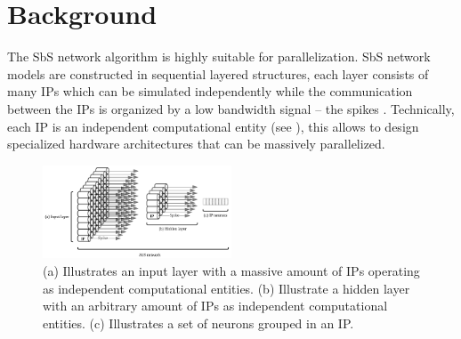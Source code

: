 \section{Background}
\label{sec:background}


The SbS network algorithm is highly suitable for parallelization. SbS network models are constructed in sequential layered structures, each layer consists of many IPs which can be simulated independently while the communication between the IPs is organized by a low bandwidth signal -- the spikes \cite{Rotermund500280}. Technically, each IP is an independent computational entity (see ), this allows to design specialized hardware architectures that can be massively parallelized.

\begin{figure}
	\centering
	\includegraphics[width=0.5\textwidth]{../figures/SbS_layer.pdf}
	\caption{(a) Illustrates an input layer with a massive amount of IPs operating as independent computational entities. (b) Illustrate a hidden layer with an arbitrary amount of IPs as independent computational entities. (c) Illustrates a set of neurons grouped in an IP. }
	\label{fig:SbS_layer}
\end{figure}